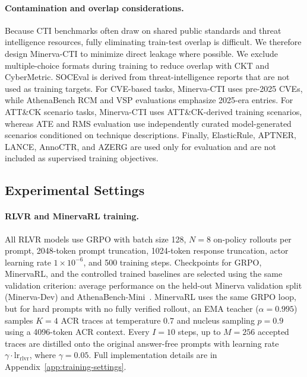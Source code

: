 \paragraph{Contamination and overlap considerations.}
Because CTI benchmarks often draw on shared public standards and threat intelligence resources, fully eliminating train-test overlap is difficult. We therefore design Minerva-CTI to minimize direct leakage where possible. We exclude multiple-choice formats during training to reduce overlap with CKT and CyberMetric. SOCEval is derived from threat-intelligence reports that are not used as training targets. For CVE-based tasks, Minerva-CTI uses pre-2025 CVEs, while AthenaBench RCM and VSP evaluations emphasize 2025-era entries. For ATT\&CK scenario tasks, Minerva-CTI uses ATT\&CK-derived training scenarios, whereas ATE and RMS evaluation use independently curated model-generated scenarios conditioned on technique descriptions. Finally, ElasticRule, APTNER, LANCE, AnnoCTR, and AZERG are used only for evaluation and are not included as supervised training objectives.




\subsection{Experimental Settings}
\label{sec:exp-settings}

\paragraph{RLVR and MinervaRL training.}
All RLVR models use GRPO with batch size 128, $N=8$ on-policy rollouts per prompt, 2048-token prompt truncation, 1024-token response truncation, actor learning rate $1\times10^{-6}$, and 500 training steps. Checkpoints for GRPO, MinervaRL, and the controlled trained baselines are selected using the same validation criterion: average performance on the held-out Minerva validation split (Minerva-Dev) and AthenaBench-Mini~\citep{alam2025athenabench}. MinervaRL uses the same GRPO loop, but for hard prompts with no fully verified rollout, an EMA teacher ($\alpha=0.995$) samples $K=4$ ACR traces at temperature $0.7$ and nucleus sampling $p=0.9$ using a 4096-token ACR context. Every $I=10$ steps, up to $M=256$ accepted traces are distilled onto the original answer-free prompts with learning rate $\gamma\cdot\mathrm{lr}_{\mathrm{rlvr}}$, where $\gamma=0.05$. Full implementation details are in Appendix~\ref{app:training-settings}.

